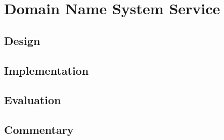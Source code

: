 \section{Domain Name System Service}
\label{sec:dns}


\subsection{Design}

\subsection{Implementation}

\subsection{Evaluation}

\subsection{Commentary}